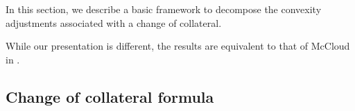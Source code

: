 \documentclass[11pt,english]{amsart}
\theoremstyle{definition}
\newtheorem{prop}{Proposition}
\newtheorem{rema}{Remark}
\begin{document}
% 
%
%
%
%
%
%
% 
%
%

In this section, we describe a basic framework to decompose the convexity adjustments associated with a change of collateral. 

While our presentation is different, the results are equivalent to that of McCloud in \cite{McCloud:CollateralVolatility}.


\subsection{Change of collateral formula}%
 
\end{document}
